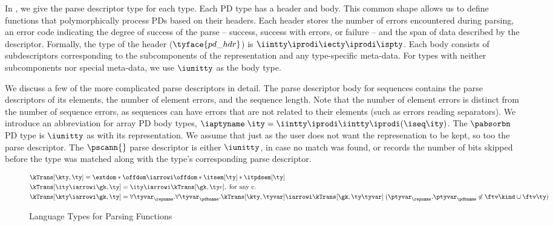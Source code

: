 In , we give the parse descriptor
type for each \ddc{} type. Each PD type has a header and body.
This common shape allows us to define functions that polymorphically
process PDs based on their headers. Each header stores the number of
errors encountered during parsing, an error code indicating the degree
of success of the parse -- success, success with errors, or failure --
and the span of data described by the descriptor.  Formally, the type
of the header  ($\tyface{pd\_hdr}$) is $\iintty \iprodi \iecty \iprodi
\ispty$.  Each body consists of subdescriptors corresponding to the
subcomponents of the representation and any type-specific meta-data. For types with neither subcomponents nor special meta-data, we
use $\iunitty$ as the body type.

We discuss a few of the more complicated parse descriptors in detail.
The parse descriptor body for sequences contains the parse descriptors of its elements,
the number of element errors, and the sequence length. Note that the
number of element errors is distinct from the number of sequence
errors, as sequences can have errors that are not related to their
elements (such as errors reading separators).  We introduce an
abbreviation for array PD body types, $\iaptyname \; \ity =
\iintty \iprodi \iintty \iprodi (\iseq \ity)$.
The $\pabsorbn$ PD
type is $\iunitty$ as with its representation. We assume that just as
the user does not want the represenation to be kept, so too the parse
descriptor.  The $\pscann{}$ parse descriptor is either $\iunitty$, in case
no match was found, or records the number of bits skipped before the
type was matched along with the type's corresponding parse descriptor.


\begin{figure}
\small
\fbox{$\kTrans[\gk,\ty] = \ity$} 
    
\begin{align*}
  &\kTrans[\kty,\ty] = \extdom * \offdom \iarrowi \offdom * \itsem[\ty] * \itpdsem[\ty]
   \\
   &\kTrans[\ity \iarrowi \gk,\ty] = \ity \iarrowi \kTrans[\gk,\ty e],
   \; \mbox{for any e}.
   \\
   &\kTrans[\kty \iarrowi \gk,\ty] = 
      \forall\tyvar_\repname.\forall\tyvar_\pdbname.
         \kTrans[\kty,\tyvar] \iarrowi \kTrans[\gk,\ty \tyvar]\; 
         (\ptyvar_\repname.\ptyvar_\pdbname \not \in \ftv \kind \cup
         \ftv \ty)
\end{align*}  
  \caption{\Implang{} Language Types for Parsing Functions}
  \label{fig:parser-types}
\end{figure}

